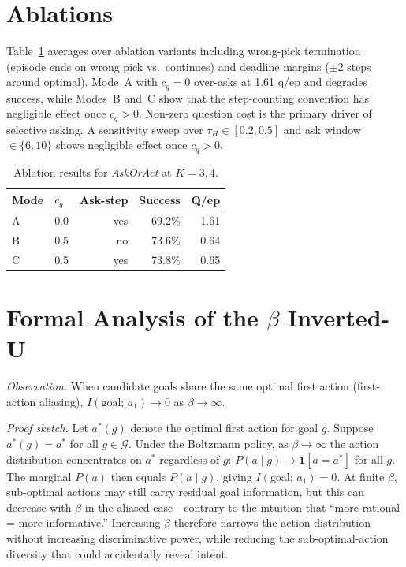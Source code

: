 \documentclass[10pt,twocolumn]{article}
\begin{document}
\section{Ablations}
\label{app:ablations}

Table~\ref{tab:ablations} averages over ablation variants including wrong-pick termination (episode ends on wrong pick vs.\ continues) and deadline margins ($\pm2$ steps around optimal).
Mode~A with $c_q{=}0$ over-asks at 1.61 q/ep and degrades success, while Modes~B and~C show that the step-counting convention has negligible effect once $c_q{>}0$.
Non-zero question cost is the primary driver of selective asking.
A sensitivity sweep over $\tau_H \in [0.2, 0.5]$ and ask window $\in \{6, 10\}$ shows negligible effect once $c_q{>}0$.

\begin{table}[h]
\centering
\caption{Ablation results for \textit{AskOrAct} at $K{=}3,4$.}
\label{tab:ablations}
\small
\begin{tabular}{llrrr}
\toprule
Mode & $c_q$ & Ask-step & Success & Q/ep \\
\midrule
A & 0.0 & yes & 69.2\% & 1.61 \\
B & 0.5 & no  & 73.6\% & 0.64 \\
C & 0.5 & yes & 73.8\% & 0.65 \\
\bottomrule
\end{tabular}
\end{table}

\section{Formal Analysis of the $\beta$ Inverted-U}
\label{app:beta_proof}

\textit{Observation.} When candidate goals share the same optimal first action (first-action aliasing), $I(\text{goal};\, a_1) \to 0$ as $\beta \to \infty$.

\textit{Proof sketch.}
Let $a^*(g)$ denote the optimal first action for goal $g$.
Suppose $a^*(g) = a^*$ for all $g \in \mathcal{G}$.
Under the Boltzmann policy, as $\beta \to \infty$ the action distribution concentrates on $a^*$ regardless of $g$: $P(a \mid g) \to \mathbf{1}[a = a^*]$ for all $g$.
The marginal $P(a)$ then equals $P(a \mid g)$, giving $I(\text{goal};\, a_1) = 0$.
At finite $\beta$, sub-optimal actions may still carry residual goal information, but this can decrease with $\beta$ in the aliased case---contrary to the intuition that ``more rational = more informative.''
Increasing $\beta$ therefore narrows the action distribution without increasing discriminative power, while reducing the sub-optimal-action diversity that could accidentally reveal intent.
\end{document}
